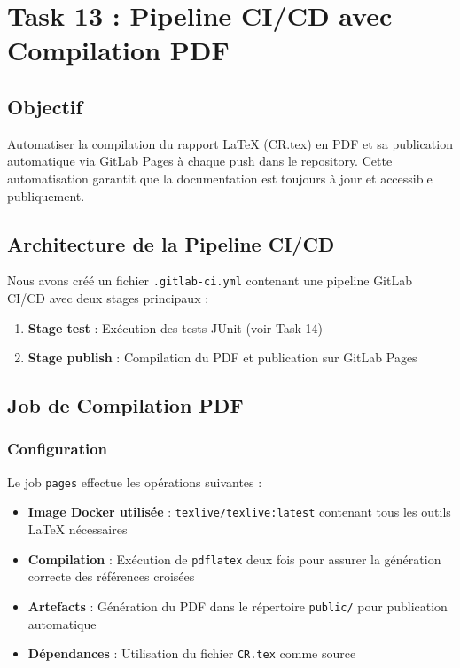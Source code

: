 \documentclass[10pt,a4paper]{article}
\begin{document}
\section{Task 13 : Pipeline CI/CD avec Compilation PDF}

\subsection{Objectif}

Automatiser la compilation du rapport LaTeX (CR.tex) en PDF et sa publication automatique via GitLab Pages à chaque push dans le repository. Cette automatisation garantit que la documentation est toujours à jour et accessible publiquement.

\subsection{Architecture de la Pipeline CI/CD}

Nous avons créé un fichier \texttt{.gitlab-ci.yml} contenant une pipeline GitLab CI/CD avec deux stages principaux :

\begin{enumerate}
    \item \textbf{Stage test} : Exécution des tests JUnit (voir Task 14)
    \item \textbf{Stage publish} : Compilation du PDF et publication sur GitLab Pages
\end{enumerate}

\subsection{Job de Compilation PDF}

\subsubsection{Configuration}

Le job \texttt{pages} effectue les opérations suivantes :

\begin{itemize}
    \item \textbf{Image Docker utilisée} : \texttt{texlive/texlive:latest} contenant tous les outils LaTeX nécessaires
    \item \textbf{Compilation} : Exécution de \texttt{pdflatex} deux fois pour assurer la génération correcte des références croisées
    \item \textbf{Artefacts} : Génération du PDF dans le répertoire \texttt{public/} pour publication automatique
    \item \textbf{Dépendances} : Utilisation du fichier \texttt{CR.tex} comme source
\end{itemize}
\end{document}
